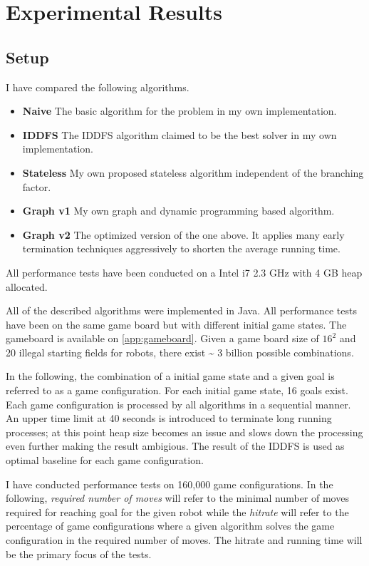 \documentclass[]{article}
\providecommand{\tightlist}{%
  \setlength{\itemsep}{0pt}\setlength{\parskip}{0pt}}
\begin{document}
\section{Experimental Results}\label{experimental-results}

\subsection{Setup}\label{setup}

I have compared the following algorithms.

\begin{itemize}
\tightlist
\item
  \textbf{Naive} The basic algorithm for the problem in my own
  implementation.
\item
  \textbf{IDDFS} The IDDFS algorithm claimed to be the best solver in my
  own implementation.
\item
  \textbf{Stateless} My own proposed stateless algorithm independent of
  the branching factor.
\item
  \textbf{Graph v1} My own graph and dynamic programming based
  algorithm.
\item
  \textbf{Graph v2} The optimized version of the one above. It applies
  many early termination techniques aggressively to shorten the average
  running time.
\end{itemize}

All performance tests have been conducted on a Intel i7 2.3 GHz with 4
GB heap allocated.

All of the described algorithms were implemented in Java. All
performance tests have been on the same game board but with different
initial game states. The gameboard is available on \ref{app:gameboard}.
Given a game board size of \(16^2\) and 20 illegal starting fields for
robots, there exist \textasciitilde{} 3 billion possible combinations.

In the following, the combination of a initial game state and a given
goal is referred to as a game configuration. For each initial game
state, 16 goals exist. Each game configuration is processed by all
algorithms in a sequential manner. An upper time limit at 40 seconds is
introduced to terminate long running processes; at this point heap size
becomes an issue and slows down the processing even further making the
result ambigious. The result of the IDDFS is used as optimal baseline
for each game configuration.

I have conducted performance tests on 160,000 game configurations. In
the following, \emph{required number of moves} will refer to the minimal
number of moves required for reaching goal for the given robot while the
\emph{hitrate} will refer to the percentage of game configurations where
a given algorithm solves the game configuration in the required number
of moves. The hitrate and running time will be the primary focus of the
tests.
\end{document}
